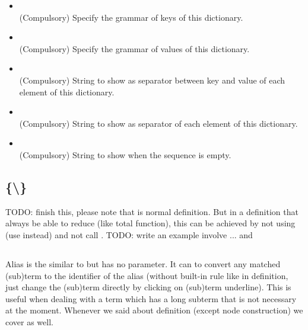 \documentclass[11pt, a4paper]{article}
\begin{document}
\begin{itemize}
    \item \kKeyGrammar {} \\
    (Compulsory) Specify the grammar of keys of this dictionary.
    \item \kValueGrammar {} \\
    (Compulsory) Specify the grammar of values of this dictionary.
    \item \kSeparator {} \\
    (Compulsory) String to show as separator between key and value of each element of this dictionary.
    \item \kDelimiter {} \\
    (Compulsory) String to show as separator of each element of this dictionary.
    \item \kWhenEmpty {} \\
    (Compulsory) String to show when the sequence is empty.
\end{itemize}

\newcommand{\kSignature}{\pkw{signature}}
\newcommand{\kPattern}{\pkw{pattern}}
\newcommand{\kReturn}{\pkw{return}}
\newcommand{\kLet}{\pkw{let}}
\newcommand{\kBe}{\pkw{be}}
\newcommand{\kMatch}{\pkw{match}}
\newcommand{\kWith}{\pkw{with}}
\newcommand{\kTotalMatch}{\pkw{total\_match}}
\subsection{\kDefinition {} \{\kPartial \textbackslash \kSequence \} }
TODO: finish this, please note that \kPartial is normal definition. But \kTotal in a definition that always be able to reduce (like total function), this can be achieved by not using \kMatch (use \kTotalMatch instead) and not call \kPartial \kDefinition.
TODO: write an example involve \kLet ... \kBe and \kTotal \kDefinition

\subsection{\kAlias {}}
Alias is the similar to \kDefinition but has no parameter. It can to convert any matched (sub)term to the identifier of the alias (without built-in rule like in definition, just change the (sub)term directly by clicking on (sub)term underline). This is useful when dealing with a term which has a long subterm that is not necessary at the moment. Whenever we said about definition (except \kDefinition node construction) we cover \kAlias as well.
\end{document}
